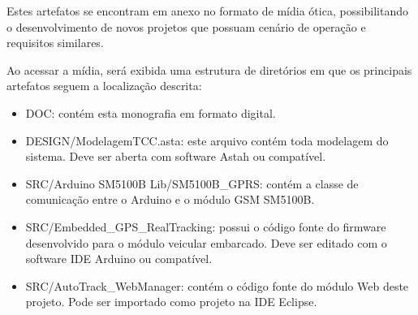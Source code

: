Estes artefatos se encontram em anexo no formato de mídia ótica, possibilitando o desenvolvimento de novos projetos que possuam cenário de operação e requisitos similares.

Ao acessar a mídia, será exibida uma estrutura de diretórios em que os principais artefatos seguem a localização descrita:

\begin{itemize}
  \item DOC: contém esta monografia em formato digital.
	\item DESIGN/ModelagemTCC.asta: este arquivo contém toda modelagem do sistema. Deve ser aberta com software Astah ou compatível.
	\item SRC/Arduino SM5100B Lib/SM5100B\_GPRS: contém a classe de comunicação entre o Arduino e o módulo GSM SM5100B.
	\item SRC/Embedded\_GPS\_RealTracking: possui o código fonte do firmware desenvolvido para o módulo veicular embarcado. Deve ser editado com o software IDE Arduino ou compatível. 
	\item SRC/AutoTrack\_WebManager: contém o código fonte do módulo Web deste projeto. Pode ser importado como projeto na IDE Eclipse.
\end{itemize} 
